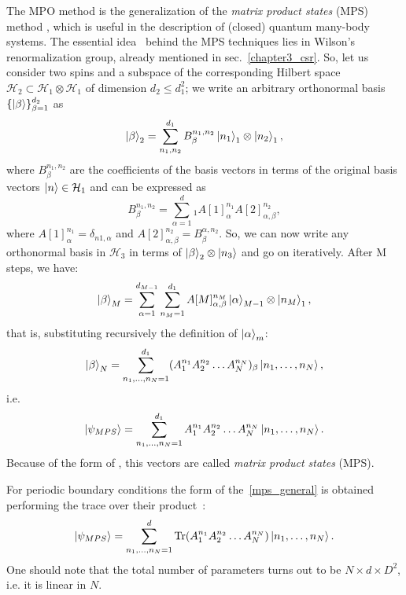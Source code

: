 The MPO method is the generalization of the \emph{matrix product states} (MPS) method \cite{SCHOLLWOCK201196}, which is useful in the description of (closed) quantum many-body systems. The essential idea~\cite{Cirac_2009} behind the MPS techniques lies in Wilson's renormalization group, already mentioned in sec.~\ref{chapter3_csr}.
So, let us consider two spins and a subspace of the corresponding Hilbert space $\mathcal{H}_2 \subset \mathcal{H}_1 \otimes \mathcal{H}_1$ of dimension $d_2 \leq d_1^2$; we write an arbitrary orthonormal basis $\{\ket{\beta}\}_{\beta=1}^{d_2}$ as
\begin{equation*}
    \ket{\beta}_2 = \sum_{n_1, n_2}^{d_{1}} B_\beta^{n_1, n_2} \ket{n_1}_1 \otimes \ket{n_2}_1,
\end{equation*}
where $B_\beta^{n_1, n_2}$ are the coefficients of the basis vectors in terms of the original basis vectors $\ket{n} \in \mathcal{H}_1$ and can be expressed as
\begin{equation*}
    B_\beta^{n_1, n_2} = \sum_{\alpha=1}^d_1 A[1]_\alpha^{n_1}A[2]_{\alpha,\beta}^{n_2},
\end{equation*}
where $A[1]_\alpha^{n_1} = \delta_{n1, \alpha}$ and $A[2]_{\alpha,\beta}^{n_2} = B_\beta^{\alpha, n_2}$. So, we can now write any orthonormal basis in $\mathcal{H}_3$ in terms of $\ket{\beta}_2\otimes \ket{n_3}$ and go on iteratively. After M steps, we have:
\begin{equation*}
    \ket{\beta}_M = \sum_{\alpha=1}^{d_{M-1}}\sum_{n_M=1}^{d_1} A[M]_{\alpha,\beta}^{n_M}\ket{\alpha}_{M-1}\otimes\ket{n_M}_1,
\end{equation*}
that is, substituting recursively the definition of $\ket{\alpha}_m$:
\begin{equation*}
    \ket{\beta}_N = \sum_{n_1,\dots,n_N=1}^{d_1} (A_1^{n_1}A_2^{n_2}\dots A_N^{n_N})_\beta \ket{n_1,\dots,n_N},
\end{equation*}
i.e.
\begin{equation}
\label{mps_general}
    \ket{\psi_{MPS}} = \sum_{n_1,\dots,n_N=1}^{d_1} A_1^{n_1}A_2^{n_2}\dots A_N^{n_N} \ket{n_1,\dots,n_N}.
\end{equation}
Because of the form of , this vectors are called \emph{matrix product states} (MPS). %

For periodic boundary conditions the form of the~\ref{mps_general} is obtained performing the trace over their product~\cite{SCHOLLWOCK201196, PhysRevLett.93.207204}:
\begin{equation}
    \ket{\psi_{MPS}} = \sum_{n_1,\dots,n_N=1}^{d} \operatorname{Tr}(A_1^{n_1}A_2^{n_2}\dots A_N^{n_N}) \ket{n_1,\dots,n_N}.
\end{equation}
One should note that the total number of parameters turns out to be $N \times d \times D^2$, i.e. it is linear in $N$.

